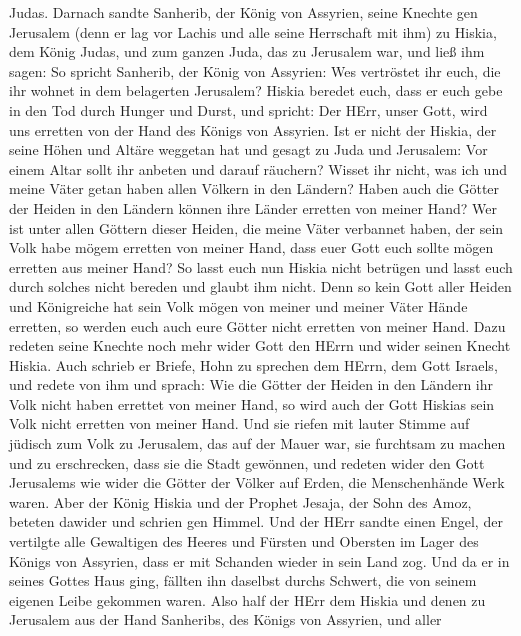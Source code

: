 Judas.  Darnach sandte Sanherib, der König von Assyrien,
seine Knechte gen Jerusalem (denn er lag vor Lachis und alle seine
Herrschaft mit ihm) zu Hiskia, dem König Judas, und zum ganzen Juda, das
zu Jerusalem war, und ließ ihm sagen:  So spricht Sanherib,
der König von Assyrien: Wes vertröstet ihr euch, die ihr wohnet in dem
belagerten Jerusalem?  Hiskia beredet euch, dass er euch
gebe in den Tod durch Hunger und Durst, und spricht: Der HErr, unser
Gott, wird uns erretten von der Hand des Königs von Assyrien.
 Ist er nicht der Hiskia, der seine Höhen und Altäre
weggetan hat und gesagt zu Juda und Jerusalem: Vor einem Altar sollt ihr
anbeten und darauf räuchern?  Wisset ihr nicht, was ich und
meine Väter getan haben allen Völkern in den Ländern? Haben auch die
Götter der Heiden in den Ländern können ihre Länder erretten von meiner
Hand?  Wer ist unter allen Göttern dieser Heiden, die meine
Väter verbannet haben, der sein Volk habe mögem erretten von meiner
Hand, dass euer Gott euch sollte mögen erretten aus meiner Hand?
 So lasst euch nun Hiskia nicht betrügen und lasst euch
durch solches nicht bereden und glaubt ihm nicht. Denn so kein Gott
aller Heiden und Königreiche hat sein Volk mögen von meiner und meiner
Väter Hände erretten, so werden euch auch eure Götter nicht erretten von
meiner Hand.  Dazu redeten seine Knechte noch mehr wider
Gott den HErrn und wider seinen Knecht Hiskia.  Auch
schrieb er Briefe, Hohn zu sprechen dem HErrn, dem Gott Israels, und
redete von ihm und sprach: Wie die Götter der Heiden in den Ländern ihr
Volk nicht haben errettet von meiner Hand, so wird auch der Gott Hiskias
sein Volk nicht erretten von meiner Hand.  Und sie riefen
mit lauter Stimme auf jüdisch zum Volk zu Jerusalem, das auf der Mauer
war, sie furchtsam zu machen und zu erschrecken, dass sie die Stadt
gewönnen,  und redeten wider den Gott Jerusalems wie wider
die Götter der Völker auf Erden, die Menschenhände Werk waren.
 Aber der König Hiskia und der Prophet Jesaja, der Sohn des
Amoz, beteten dawider und schrien gen Himmel.  Und der HErr
sandte einen Engel, der vertilgte alle Gewaltigen des Heeres und Fürsten
und Obersten im Lager des Königs von Assyrien, dass er mit Schanden
wieder in sein Land zog. Und da er in seines Gottes Haus ging, fällten
ihn daselbst durchs Schwert, die von seinem eigenen Leibe gekommen
waren.  Also half der HErr dem Hiskia und denen zu
Jerusalem aus der Hand Sanheribs, des Königs von Assyrien, und aller
